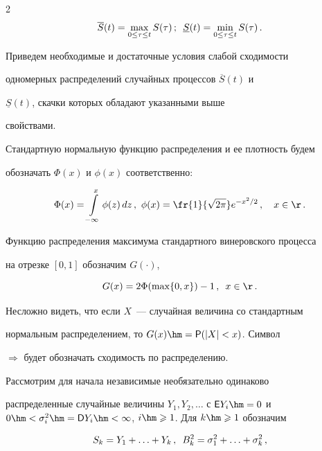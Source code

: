 \begin{multicols}{2}
$$


\overline S(t)=\max\limits_{0\le\tau\le t}S(\tau)\,;\enskip \underline


S(t)=\min\limits_{0\le\tau \le t}S(\tau)\,.


$$


Приведем необходимые и достаточные условия слабой сходимости


одномерных распределений случайных процессов $\overline S(t)$ и


$\underline S(t)$, скачки которых обладают указанными выше


свойствами.





Стандартную нормальную функцию распределения и ее плотность будем


обозначать $\Phi(x)$ и $\phi(x)$ соответственно:


$$


\Phi(x)=\int\limits_{-\infty}^{x}\phi(z)\,dz\,,\ 


\phi(x)=\fr{1}{\sqrt{2\pi}}e^{-x^2/2}\,,\ \ \ x\in\r\,.


$$


Функцию распределения максимума стандартного винеровского процесса


на отрезке $[0,1]$ обозначим $G(\cdot)$,


$$


G(x)=2\Phi(\max\{0,x\})-1\,, \enskip  x\in\r\,.


$$


Несложно видеть, что если $X$~--- случайная величина со стандартным


нормальным распределением, то $G(x)\hm={\sf P}(|X|<x)$. Символ


$\Longrightarrow$ будет обозначать сходимость по распределению.





Рассмотрим для начала независимые необязательно одинаково


распределенные случайные величины $Y_1,Y_2,\ldots$ с ${\sf


E}Y_i\hm=0$ и $0\hm<\sigma^2_i\hm={\sf D}Y_i\hm<\infty$, $i\hm\geqslant 1$. Для $k\hm\geqslant


1$ обозначим


$$


S_k=Y_1+\ldots+Y_k\,, \enskip B^2_k=\sigma^2_1+\ldots+\sigma^2_k\,,


$$


$$



\end{multicols}
